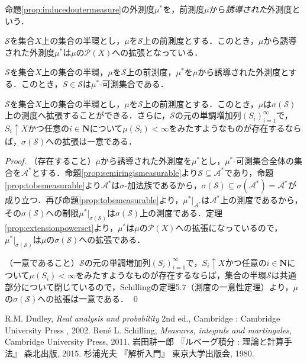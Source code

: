 \documentclass[12pt,a4paper]{jsarticle}
\begin{document}
命題\ref{prop:inducedoutermeasure}の外測度$\mu^*$を，前測度$\mu$から\emph{誘導された}外測度という．

\begin{proposition}\label{prop:extensionpowerset}
    $\mathcal{S}$を集合$X$上の集合の半環とし，$\mu$を$\mathcal{S}$上の前測度とする．このとき，$\mu$から誘導された外測度$\mu^*$は$\mu$の$\mathcal{P}(X)$への拡張となっている．
\end{proposition}

\begin{proposition}\label{prop:semiringismeasurable}
    $\mathcal{S}$を集合$X$上の集合の半環，$\mu$を$\mathcal{S}$上の前測度，$\mu^*$を$\mu$から誘導された外測度とする．このとき，$S \in \mathcal{S}$は$\mu^*$-可測集合である．
\end{proposition}

\begin{theorem}
    $\mathcal{S}$を集合$X$上の集合の半環とし，$\mu$を$\mathcal{S}$上の前測度とする．このとき，$\mu$は$\sigma(\mathcal{S})$上の測度へ拡張することができる．さらに，$\mathcal{S}$の元の単調増加列$(S_i)_{i = 1}^\infty$で，$S_i \uparrow X$かつ任意の$i \in \bm{N}$について$\mu(S_i) < \infty$をみたすようなものが存在するならば，$\sigma(\mathcal{S})$への拡張は一意である．
\end{theorem}

\begin{proof}
    （存在すること）$\mu$から誘導された外測度を$\mu^*$とし，$\mu^*$-可測集合全体の集合を$\mathcal{A}^*$とする．命題\ref{prop:semiringismeasurable}より$\mathcal{S} \subseteq \mathcal{A}^*$であり，命題\ref{prop:tobemeasurable}より$\mathcal{A}^*$は$\sigma$-加法族であるから，$\sigma(\mathcal{S}) \subseteq \sigma(\mathcal{A}^*) = \mathcal{A}^*$が成り立つ．再び命題\ref{prop:tobemeasurable}より，$\mu^*|_{\mathcal{A}^*}$は$\mathcal{A}^*$上の測度であるから，その$\sigma(\mathcal{S})$への制限$\mu^*|_{\sigma(\mathcal{S})}$は$\sigma(\mathcal{S})$上の測度である．定理\ref{prop:extensionpowerset}より，$\mu^*$は$\mu$の$\mathcal{P}(X)$への拡張になっているので，$\mu^*|_{\sigma(\mathcal{S})}$は$\mu$の$\sigma(\mathcal{S})$への拡張である．

    （一意であること）$\mathcal{S}$の元の単調増加列$(S_i)_{i = 1}^\infty$で，$S_i \uparrow X$かつ任意の$i \in \bm{N}$について$\mu(S_i) < \infty$をみたすようなものが存在するならば，集合の半環$\mathcal{S}$は共通部分について閉じているので，Schilling\cite{Schilling}の定理5.7（測度の一意性定理）より，$\mu$の$\sigma(\mathcal{S})$への拡張は一意である．
    \qed
\end{proof}

\begin{thebibliography}{99}
    R.M. Dudley,
    \textit{Real analysis and probability} 2nd ed.,
    Cambridge : Cambridge University Press , 2002.
    Ren\'{e} L. Schilling,
    \textit{Measures, integrals and martingales},
    Cambridge University Press, 2011.
    岩田耕一郎
    『ルベーグ積分 : 理論と計算手法』
    森北出版, 2015.
    杉浦光夫
     『解析入門』
     東京大学出版会, 1980.
\end{thebibliography}
\end{document}
